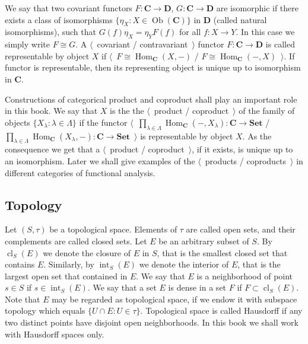 We say that two covariant functors $F:\mathbf{C}\to\mathbf{D}$,
$G:\mathbf{C}\to\mathbf{D}$ are isomorphic if there exists a class of
isomorphisms $ \{\eta_X:X\in\operatorname{Ob}(\mathbf{C}) \}$ in $\mathbf{D}$
(called natural isomorphisms), such that $G(f)\eta_X=\eta_Y F(f)$ for all
$f:X\to Y$. In this case we simply write $F\cong G$. A $\langle$~covariant /
contravariant~$\rangle$ functor $F:\mathbf{C}\to\mathbf{D}$ is called
representable by object $X$ if
$\langle$~$F\cong\operatorname{Hom}_{\mathbf{C}}(X,-)$ /
$F\cong\operatorname{Hom}_{\mathbf{C}}(-,X)$~$\rangle$. If functor is
representable, then its representing object is unique up to isomorphism in
$\mathbf{C}$.

Constructions of categorical product and coproduct shall play an important role
in this book. We say that $X$ is the the $\langle$~product / coproduct~$\rangle$
of the family of objects $ \{X_\lambda:\lambda\in\Lambda \}$ if the functor
$\langle$~$
\prod_{\lambda\in\Lambda}\operatorname{Hom}_{\mathbf{C}}(-,X_{\lambda})
:\mathbf{C}\to\mathbf{Set}$
/
$
\prod_{\lambda\in\Lambda}\operatorname{Hom}_{\mathbf{C}}(X_{\lambda},-)
:\mathbf{C}\to\mathbf{Set}$~$\rangle$
is representable by object $X$. As the consequence we get that a
$\langle$~product / coproduct~$\rangle$, if it exists, is unique up to an
isomorphism. Later we shall give examples of the $\langle$~products /
coproducts~$\rangle$ in different categories of functional analysis. 



\subsection{Topology}\label{SubSectionTopology}

Let $(S,\tau)$ be a topological space. Elements of $\tau$ are called open sets,
and their complements are called closed sets. Let $E$ be an arbitrary subset of
$S$. By $\operatorname{cl}_S(E)$ we denote the closure of $E$ in $S$, that is
the smallest closed set that contains $E$. Similarly, by
$\operatorname{int}_S(E)$ we denote the interior of $E$, that is the largest
open set that contained in $E$. We say that $E$ is a neighborhood of point 
$s\in S$ if $s\in \operatorname{int}_S(E)$. We say that a set $E$ is dense 
in a set $F$ if $F\subset\operatorname{cl}_S(E)$. Note that $E$ may be regarded
as topological space, if we endow it with subspace topology which equals $
\{U\cap E:U\in\tau \}$. Topological space is called Hausdorff if any two
distinct points have disjoint open neighborhoods. In this book we shall work
with Hausdorff spaces only.


